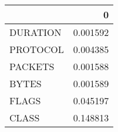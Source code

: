 \begin{tabular}{lr}
\toprule
{} &         0 \\
\midrule
DURATION &  0.001592 \\
PROTOCOL &  0.004385 \\
PACKETS  &  0.001588 \\
BYTES    &  0.001589 \\
FLAGS    &  0.045197 \\
CLASS    &  0.148813 \\
\bottomrule
\end{tabular}
